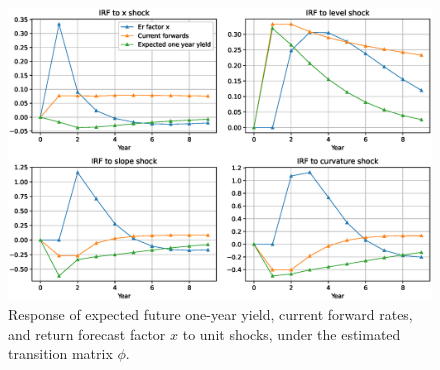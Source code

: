 \begin{figure}[h!]
	\centering
	\caption{Response of expected future one-year yield, current forward rates, and return forecast factor $x$ to unit shocks, under the estimated transition matrix $\phi$.}\label{fig:10}
	\includegraphics[scale=0.5]{fig/eps/Figure10.eps}
\end{figure}
